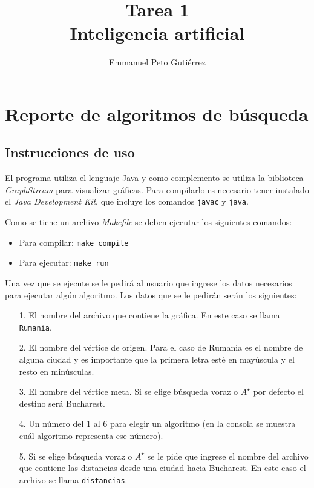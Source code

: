 \documentclass{article}
\title{Tarea 1\\Inteligencia artificial}
\author{Emmanuel Peto Gutiérrez}
\begin{document}
\maketitle

\section*{Reporte de algoritmos de búsqueda}

\subsection*{Instrucciones de uso}

El programa utiliza el lenguaje Java y como complemento se utiliza la biblioteca \textit{GraphStream} para visualizar gráficas. Para compilarlo es necesario tener instalado el \textit{Java Development Kit}, que incluye los comandos \texttt{javac} y \texttt{java}.

Como se tiene un archivo \textit{Makefile} se deben ejecutar los siguientes comandos:
\begin{itemize}
\item Para compilar: \texttt{make compile}
\item Para ejecutar: \texttt{make run}
\end{itemize}

Una vez que se ejecute se le pedirá al usuario que ingrese los datos necesarios para ejecutar algún algoritmo. Los datos que se le pedirán serán los siguientes:
\begin{itemize}
\item[1.] El nombre del archivo que contiene la gráfica. En este caso se llama \texttt{Rumania}.
\item[2.] El nombre del vértice de origen. Para el caso de Rumania es el nombre de alguna ciudad y es importante que la primera letra esté en mayúscula y el resto en minúsculas.
\item[3.] El nombre del vértice meta. Si se elige búsqueda voraz o $A^{\star}$ por defecto el destino será Bucharest.
\item[4.] Un número del 1 al 6 para elegir un algoritmo (en la consola se muestra cuál algoritmo representa ese número).
\item[5.] Si se elige búsqueda voraz o $A^{\star}$ se le pide que ingrese el nombre del archivo que contiene las distancias desde una ciudad hacia Bucharest. En este caso el archivo se llama \texttt{distancias}.
\end{itemize}
\end{document}
